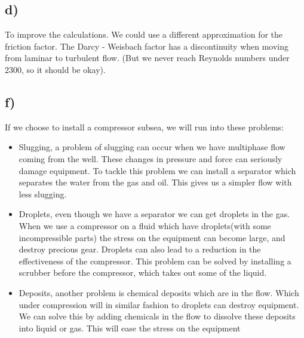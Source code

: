 \documentclass[DIV=calc, paper=a4, fontsize=13pt, twocolumn]{scrartcl}	 %
\begin{document}
\subsection*{d)}
To improve the calculations. We could use a different approximation for the friction factor. The Darcy - Weisbach factor has a discontinuity when moving from laminar to turbulent flow. (But we never reach Reynolds numbers under 2300, so it should be okay). 
\subsection*{f)}
If we choose to install a compressor subsea, we will run into these problems:
\begin{itemize}
\item Slugging, a problem of slugging can occur when we have multiphase flow coming from the well. These changes in pressure and force can seriously damage equipment. To tackle this problem we can install a separator which separates the water from the gas and oil. This gives us a simpler flow with less slugging.
\item Droplets, even though we have a separator we can get droplets in the gas. When we use a compressor on a fluid which have droplets(with some incompressible parts) the stress on the equipment can become large, and destroy precious gear. Droplets can also lead to a reduction in the effectiveness of the compressor. This problem can be solved by installing a scrubber before the compressor, which takes out some of the liquid.
\item Deposits, another problem is chemical deposits which are in the flow. Which under compression will in similar fashion to droplets can destroy equipment. We can solve this by adding chemicals in the flow to dissolve these deposits into liquid or gas. This will ease the stress on the equipment
\end{itemize}
\end{document}
